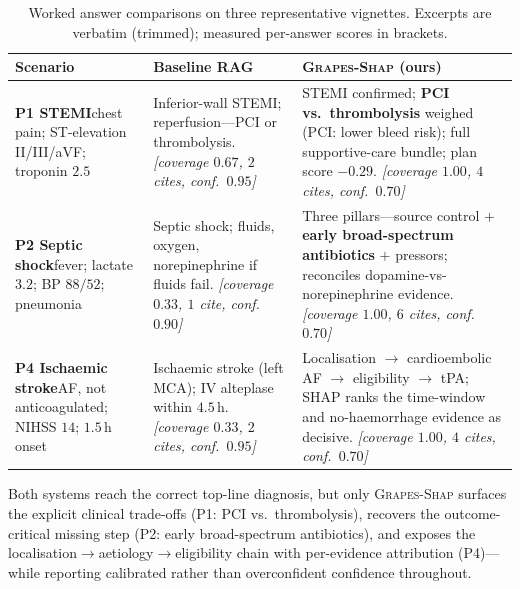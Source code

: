 \documentclass[conference]{IEEEtran}
\newcommand{\method}{\textsc{Grapes-Shap}}
\begin{document}
\begin{table}[t]
\caption{Worked answer comparisons on three representative vignettes. Excerpts
are verbatim (trimmed); measured per-answer scores in brackets.}
\label{tab:demo}
\centering
\footnotesize
\renewcommand{\arraystretch}{1.25}
\begin{tabular}{@{}p{} p{} p{}@{}}
\toprule
\textbf{Scenario} & \textbf{Baseline RAG} & \textbf{\method{} (ours)}\\
\midrule
\textbf{P1 STEMI}\newline chest pain; ST-elevation II/III/aVF; troponin $2.5$ &
Inferior-wall STEMI; reperfusion---PCI or thrombolysis.\newline
\emph{[coverage $0.67$, $2$ cites, conf.\ $0.95$]} &
STEMI confirmed; \textbf{PCI vs.\ thrombolysis} weighed (PCI: lower bleed risk);
full supportive-care bundle; plan score $-0.29$.\newline
\emph{[coverage $1.00$, $4$ cites, conf.\ $0.70$]}\\
\midrule
\textbf{P2 Septic shock}\newline fever; lactate $3.2$; BP $88/52$; pneumonia &
Septic shock; fluids, oxygen, norepinephrine if fluids fail.\newline
\emph{[coverage $0.33$, $1$ cite, conf.\ $0.90$]} &
Three pillars---source control $+$ \textbf{early broad-spectrum antibiotics} $+$
pressors; reconciles dopamine-vs-norepinephrine evidence.\newline
\emph{[coverage $1.00$, $6$ cites, conf.\ $0.70$]}\\
\midrule
\textbf{P4 Ischaemic stroke}\newline AF, not anticoagulated; NIHSS $14$; $1.5$\,h onset &
Ischaemic stroke (left MCA); IV alteplase within $4.5$\,h.\newline
\emph{[coverage $0.33$, $2$ cites, conf.\ $0.95$]} &
Localisation $\rightarrow$ cardioembolic AF $\rightarrow$ eligibility
$\rightarrow$ tPA; SHAP ranks the time-window and no-haemorrhage evidence as
decisive.\newline
\emph{[coverage $1.00$, $4$ cites, conf.\ $0.70$]}\\
\bottomrule
\end{tabular}
\end{table}

Both systems reach the correct top-line diagnosis, but only \method{} surfaces
the explicit clinical trade-offs (P1: PCI vs.\ thrombolysis), recovers the
outcome-critical missing step (P2: early broad-spectrum antibiotics), and
exposes the localisation$\rightarrow$aetiology$\rightarrow$eligibility chain with
per-evidence attribution (P4)---while reporting calibrated rather than
overconfident confidence throughout.
\end{document}
